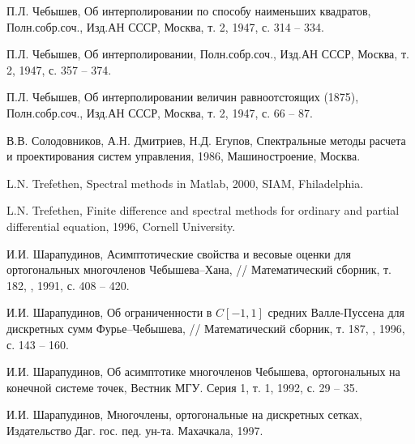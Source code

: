 \begin{thebibliography}{999}

П.Л. Чебышев,
Об интерполировании по способу наименьших квадратов,
Полн.собр.соч., Изд.АН СССР, Москва, т. 2, 1947, с. 314 -- 334.



П.Л. Чебышев,
Об интерполировании, Полн.собр.соч., Изд.АН СССР, Москва, т. 2, 1947, с. 357 -- 374.



П.Л. Чебышев,
Об интерполировании величин  равноотстоящих (1875),
Полн.собр.соч., Изд.АН СССР, Москва, т. 2, 1947, с. 66 -- 87.



В.В. Солодовников, А.Н. Дмитриев, Н.Д. Егупов,
Спектральные методы расчета и проектирования систем управления, 1986, Машиностроение, Москва.




L.N. Trefethen,
Spectral methods in Matlab, 2000, SIAM, Fhiladelphia.



L.N. Trefethen,
Finite difference and spectral methods for ordinary and partial differential equation,
1996, Cornell University.



И.И. Шарапудинов,
Асимптотические свойства и весовые оценки для ортогональных многочленов Чебышева–Хана,
// Математический сборник, т. 182, , 1991, с. 408 -- 420.



И.И. Шарапудинов,
Об ограниченности в $C[-1,1]$ средних Валле-Пуссена для дискретных сумм Фурье–Чебышева,
// Математический сборник, т. 187, , 1996, с. 143 -- 160.




И.И. Шарапудинов,
Об асимптотике многочленов Чебышева, ортогональных на конечной системе точек,
Вестник МГУ. Серия 1, т. 1, 1992, с. 29 -- 35.



И.И. Шарапудинов,
Многочлены, ортогональные на дискретных сетках,
Издательство Даг. гос. пед. ун-та. Махачкала, 1997.




\end{thebibliography}
